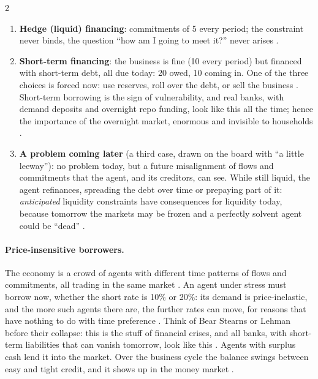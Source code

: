 \begin{paracol}{2}
\begin{enumerate}
  \item \textbf{Hedge (liquid) financing}: commitments of 5 every period; the constraint never binds, the question ``how am I going to
        meet it?'' never arises .
  \item \textbf{Short-term financing}: the business is fine (10 every period) but financed with short-term debt, all due today: 20 owed,
        10 coming in. One of the three choices is forced now: use reserves, roll over the debt, or sell the business
        . Short-term borrowing is the sign of vulnerability, and real banks, with demand deposits and overnight
        repo funding, look like this all the time; hence the importance of the overnight market, enormous and invisible to households
        .
  \item \textbf{A problem coming later} (a third case, drawn on the board with ``a little leeway''): no problem today, but a future misalignment of flows and commitments that the agent, and its creditors,
        can see. While still liquid, the agent refinances, spreading the debt over time or prepaying part of it: \emph{anticipated} liquidity
        constraints have consequences for liquidity today, because tomorrow the markets may be frozen and a perfectly solvent agent could be
        ``dead'' .
\end{enumerate}

\paragraph{Price-insensitive borrowers.} The economy is a crowd of agents with different time patterns of flows and commitments, all trading
in the same market . An agent under stress must borrow now, whether the short rate is 10\% or 20\%: its demand
is price-inelastic, and the more such agents there are, the further rates can move, for reasons that have nothing to do with time preference
. Think of Bear Stearns or Lehman before their collapse: this is the stuff of financial crises, and all banks, with
short-term liabilities that can vanish tomorrow, look like this . Agents with surplus cash lend it into the market. Over the
business cycle the balance swings between easy and tight credit, and it shows up in the money market .


\end{paracol}
